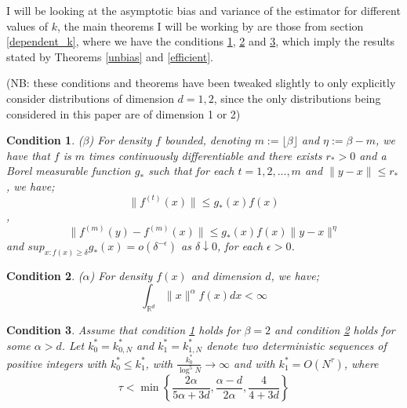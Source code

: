 \documentclass{report}
\newtheorem{remark}{Condition}
\begin{document}
I will be looking at the asymptotic bias and variance of the estimator for different values of $k$, the main theorems I will be working by are those from section \ref{dependent_k}, where we have the conditions \ref{A1}, \ref{A2} and \ref{A3}, which imply the results stated by Theorems \ref{unbias} and \ref{efficient}. 

(NB: these conditions and theorems have been tweaked slightly to only explicitly consider distributions of dimension $d=1, 2$, since the only distributions being considered in this paper are of dimension 1 or 2)

\begin{remark} ($\beta$) \label{A1}
For density $f$ bounded, denoting $m := \lfloor \beta \rfloor$ and $\eta := \beta -m$, we have that $f$ is $m$ times continuously differentiable and there exists $r_{*} > 0$ and a Borel measurable function $g_{*}$ such that for each $t = 1, 2, ... , m$ and $\|y-x\| \leq r_{*}$, we have;
\begin{equation}
\| f^{(t)} (x) \| \leq g_{*}(x)f(x) \nonumber
\end{equation},
\begin{equation}
\| f^{(m)} (y) - f^{(m)} (x) \| \leq g_{*}(x)f(x) \|y-x\|^{\eta} \nonumber
\end{equation}
and $sup_{x:f(x)\geq \delta} g_{*}(x) = o(\delta^{-\epsilon})$ as $\delta \downarrow 0$, for each $\epsilon > 0$.
\end{remark}

\begin{remark} ($\alpha$) \label{A2}
For density $f(x)$ and dimension $d$, we have;
\begin{equation}
\int_{\mathbb{R}^{d}} \| x \|^{\alpha} f(x) dx < \infty \nonumber
\end{equation}
\end{remark}

\begin{remark} \label{A3}
Assume that condition \ref{A1} holds for $\beta = 2$ and condition \ref{A2} holds for some $\alpha > d$. Let $k_{0}^{*} = k_{0, N}^{*}$ and $k_{1}^{*} = k_{1, N}^{*}$ denote two deterministic sequences of positive integers with $k_{0}^{*} \leq k_{1}^{*}$, with $\frac{k_{0}^{*}}{\log^{5}{N}} \to \infty$ and with $k_{1}^{*} = O(N^{\tau})$, where
\begin{equation}
\tau < \min \left\{ \frac{2 \alpha}{5 \alpha + 3d} , \frac{\alpha - d}{2 \alpha} , \frac{4}{4 + 3d} \right\} \nonumber
\end{equation}
\end{remark}
\end{document}
